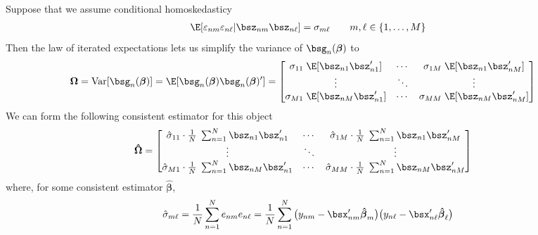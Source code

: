 \documentclass[12pt]{article}
\theoremstyle{plain}
\theoremstyle{definition}
\theoremstyle{remark}
\newcommand{\bsbeta}{\boldsymbol{\beta}}
\newcommand{\bsOmega}{\boldsymbol{\Omega}}
\newcommand{\bshatbeta}{\boldsymbol{\hat{\beta}}}
\newcommand{\bshatOmega}{\boldsymbol{\hat{\Omega}}}
\newcommand{\Var}{\operatorname{Var}}
\newcommand{\sumnN}{\sum^N_{n=1}}
\begin{document}
Suppose that we assume conditional homoskedasticy
\begin{align*}
  \E[\varepsilon_{nm}\varepsilon_{n\ell}|\bsz_{nm}\bsz_{n\ell}]
  = \sigma_{m\ell}
  \qquad m,\ell\in\{1,\ldots,M\}
\end{align*}
Then the law of iterated expectations lets us simplify the variance of
$\bsg_n(\bsbeta)$ to
\begin{align*}
  \bsOmega =
    \Var[\bsg_n(\bsbeta)]
    =
    \E[\bsg_n(\bsbeta)\bsg_n(\bsbeta)']
    &=
    \begin{bmatrix}
      \sigma_{11}\;
      \E[\bsz_{n1}\bsz_{n1}']
      &\cdots &
      \sigma_{1M}\;
      \E[\bsz_{n1}\bsz_{nM}']
      \\
      \vdots & \ddots & \vdots
      \\
      \sigma_{M1}\;
      \E[\bsz_{nM}\bsz_{n1}']
      &\cdots &
      \sigma_{MM}\;
      \E[\bsz_{nM}\bsz_{nM}']
    \end{bmatrix}
\end{align*}
We can form the following consistent estimator for this object
\begin{align}
  \bshatOmega
    &=
    \begin{bmatrix}
      \hat{\sigma}_{11}\cdot\frac{1}{N}\;
      \sumnN \bsz_{n1}\bsz_{n1}'
      &\cdots &
      \hat{\sigma}_{1M}\cdot\frac{1}{N}\;
      \sumnN \bsz_{n1}\bsz_{nM}'
      \\
      \vdots & \ddots & \vdots
      \\
      \hat{\sigma}_{M1}\cdot\frac{1}{N}\;
      \sumnN\bsz_{nM}\bsz_{n1}'
      &\cdots &
      \hat{\sigma}_{MM}\cdot\frac{1}{N}\;
      \sumnN\bsz_{nM}\bsz_{nM}'
    \end{bmatrix}
    \label{five}
\end{align}
where, for some consistent estimator $\bshatbeta$,
\begin{align}
  \hat{\sigma}_{m\ell}
  =
  \frac{1}{N} \sumnN
  e_{nm}
  e_{n\ell}
  =
  \frac{1}{N} \sumnN
  \big(y_{nm} - \bsx_{nm}'\bshatbeta_{m}\big)
  \big(y_{n\ell} - \bsx_{n\ell}'\bshatbeta_{\ell}\big)
  \label{fivecorr}
\end{align}
\end{document}
